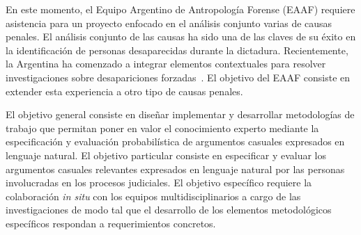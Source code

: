 \documentclass[a4paper,11pt]{book}
\theoremstyle{definition}
\begin{document}

En este momento, el Equipo Argentino de Antropolog\'ia Forense (EAAF) requiere asistencia para un proyecto enfocado en el an\'alisis conjunto varias de causas penales.
%
El an\'alisis conjunto de las causas ha sido una de las claves de su \'exito en la identificaci\'on de personas desaparecidas durante la dictadura.
%
%
Recientemente, la Argentina ha comenzado a integrar elementos contextuales para resolver investigaciones sobre desapariciones forzadas~\cite{caridi2020-peopleSearch}.
%
El objetivo del EAAF consiste en extender esta experiencia a otro tipo de causas penales.


El objetivo general consiste en dise\~nar implementar y desarrollar metodolog\'ias de trabajo que permitan poner en valor el conocimiento experto mediante la especificaci\'on y evaluaci\'on probabil\'istica de argumentos casuales expresados en lenguaje natural.
%
El objetivo particular consiste en especificar y evaluar los argumentos casuales relevantes expresados en lenguaje natural por las personas involucradas en los procesos judiciales.
%
El objetivo espec\'ifico requiere la colaboraci\'on \emph{in situ} con los equipos multidisciplinarios a cargo de las investigaciones de modo tal que el desarrollo de los elementos metodol\'ogicos espec\'ificos respondan a requerimientos concretos.
\end{document}
